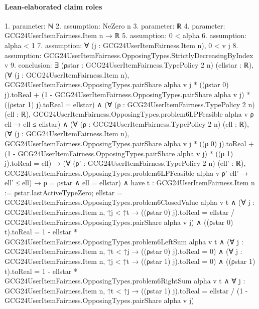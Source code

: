 \documentclass[10pt]{article}
\begin{document}
\paragraph{Lean-elaborated claim roles}\begin{ReviewVerbatim}
1. parameter: ℕ
2. assumption: NeZero n
3. parameter: ℝ
4. parameter: GCG24UserItemFairness.Item n → ℝ
5. assumption: 0 < alpha
6. assumption: alpha < 1
7. assumption: ∀ (j : GCG24UserItemFairness.Item n), 0 < v j
8. assumption: GCG24UserItemFairness.OpposingTypes.StrictlyDecreasingByIndex v
9. conclusion: ∃ (ρstar : GCG24UserItemFairness.TypePolicy 2 n) (ellstar : ℝ),
  (∀ (j : GCG24UserItemFairness.Item n),
      GCG24UserItemFairness.OpposingTypes.pairShare alpha v j * ((ρstar 0) j).toReal +
          (1 - GCG24UserItemFairness.OpposingTypes.pairShare alpha v j) * ((ρstar 1) j).toReal =
        ellstar) ∧
    (∀ (ρ : GCG24UserItemFairness.TypePolicy 2 n) (ell : ℝ),
        GCG24UserItemFairness.OpposingTypes.problem6LPFeasible alpha v ρ ell → ell ≤ ellstar) ∧
      (∀ (ρ : GCG24UserItemFairness.TypePolicy 2 n) (ell : ℝ),
          (∀ (j : GCG24UserItemFairness.Item n),
              GCG24UserItemFairness.OpposingTypes.pairShare alpha v j * ((ρ 0) j).toReal +
                  (1 - GCG24UserItemFairness.OpposingTypes.pairShare alpha v j) * ((ρ 1) j).toReal =
                ell) →
            (∀ (ρ' : GCG24UserItemFairness.TypePolicy 2 n) (ell' : ℝ),
                GCG24UserItemFairness.OpposingTypes.problem6LPFeasible alpha v ρ' ell' → ell' ≤ ell) →
              ρ = ρstar ∧ ell = ellstar) ∧
        have t : GCG24UserItemFairness.Item n := ρstar.lastActiveTypeZero;
        ellstar = GCG24UserItemFairness.OpposingTypes.problem6ClosedValue alpha v t ∧
          (∀ {j : GCG24UserItemFairness.Item n},
              ↑j < ↑t → ((ρstar 0) j).toReal = ellstar / GCG24UserItemFairness.OpposingTypes.pairShare alpha v j) ∧
            ((ρstar 0) t).toReal = 1 - ellstar * GCG24UserItemFairness.OpposingTypes.problem6LeftSum alpha v t ∧
              (∀ {j : GCG24UserItemFairness.Item n}, ↑t < ↑j → ((ρstar 0) j).toReal = 0) ∧
                (∀ {j : GCG24UserItemFairness.Item n}, ↑j < ↑t → ((ρstar 1) j).toReal = 0) ∧
                  ((ρstar 1) t).toReal = 1 - ellstar * GCG24UserItemFairness.OpposingTypes.problem6RightSum alpha v t ∧
                    ∀ {j : GCG24UserItemFairness.Item n},
                      ↑t < ↑j →
                        ((ρstar 1) j).toReal = ellstar / (1 - GCG24UserItemFairness.OpposingTypes.pairShare alpha v j)
\end{ReviewVerbatim}
\end{document}
